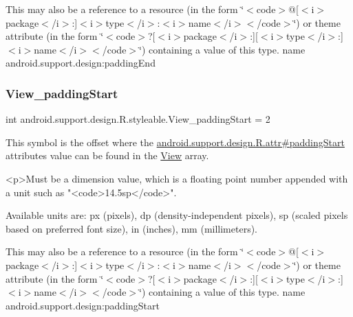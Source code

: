 This may also be a reference to a resource (in the form \char`\"{}$<$code$>$@\mbox{[}$<$i$>$package$<$/i$>$\+:\mbox{]}$<$i$>$type$<$/i$>$\+:$<$i$>$name$<$/i$>$$<$/code$>$\char`\"{}) or theme attribute (in the form \char`\"{}$<$code$>$?\mbox{[}$<$i$>$package$<$/i$>$\+:\mbox{]}\mbox{[}$<$i$>$type$<$/i$>$\+:\mbox{]}$<$i$>$name$<$/i$>$$<$/code$>$\char`\"{}) containing a value of this type.  name android.\+support.\+design\+:padding\+End \mbox{\label{classandroid_1_1support_1_1design_1_1R_1_1styleable_a39729af0c88068197b82555ede76dbd1}} 
\subsubsection{\texorpdfstring{View\+\_\+padding\+Start}{View\_paddingStart}}
{\footnotesize\ttfamily int android.\+support.\+design.\+R.\+styleable.\+View\+\_\+padding\+Start = 2\hspace{0.3cm}{\ttfamily [static]}}

This symbol is the offset where the \hyperlink{classandroid_1_1support_1_1design_1_1R_1_1attr_a0664bf5d1b33cdf9ca567e82b1006290}{android.\+support.\+design.\+R.\+attr\#padding\+Start} attribute\textquotesingle{}s value can be found in the \hyperlink{classandroid_1_1support_1_1design_1_1R_1_1styleable_ae848bcf5b638b9248537d28ebf90c67f}{View} array.

\begin{DoxyVerb}      <p>Must be a dimension value, which is a floating point number appended with a unit such as "<code>14.5sp</code>".
\end{DoxyVerb}
 Available units are\+: px (pixels), dp (density-\/independent pixels), sp (scaled pixels based on preferred font size), in (inches), mm (millimeters). 

This may also be a reference to a resource (in the form \char`\"{}$<$code$>$@\mbox{[}$<$i$>$package$<$/i$>$\+:\mbox{]}$<$i$>$type$<$/i$>$\+:$<$i$>$name$<$/i$>$$<$/code$>$\char`\"{}) or theme attribute (in the form \char`\"{}$<$code$>$?\mbox{[}$<$i$>$package$<$/i$>$\+:\mbox{]}\mbox{[}$<$i$>$type$<$/i$>$\+:\mbox{]}$<$i$>$name$<$/i$>$$<$/code$>$\char`\"{}) containing a value of this type.  name android.\+support.\+design\+:padding\+Start \mbox{\label{classandroid_1_1support_1_1design_1_1R_1_1styleable_a9ec1420eec04ffdfd76d5ad0ea0818ef}} 
